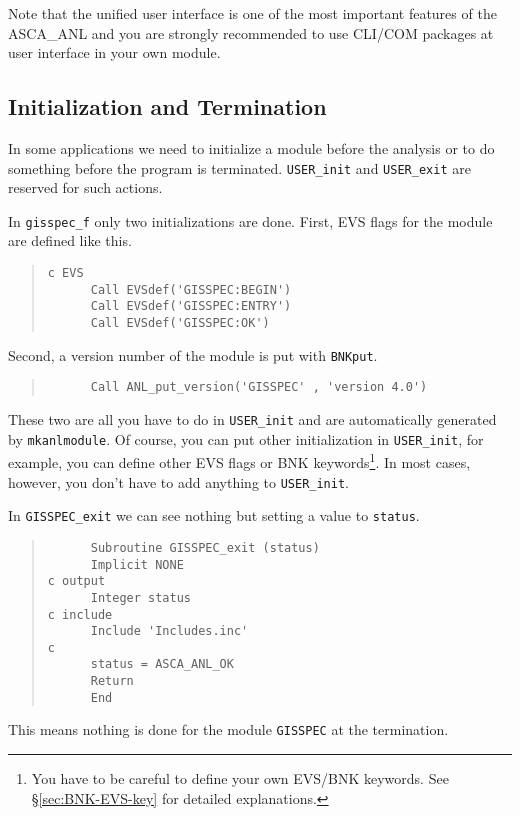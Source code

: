Note that
the unified user interface
is one of the most important features of the ASCA\_ANL
and you are strongly recommended to use CLI/COM packages
at user interface in your own module.

\subsection{Initialization and Termination}
In some applications
we need to initialize a module before the analysis
or to do something before the program is terminated.
{\tt USER\_init} and {\tt USER\_exit} are reserved for such actions.

In {\tt gisspec\_f}
only two initializations are done.
First,
EVS flags for the module are defined like this.
\begin{quote}\baselineskip 3.2mm\begin{verbatim}
c EVS
      Call EVSdef('GISSPEC:BEGIN')
      Call EVSdef('GISSPEC:ENTRY')
      Call EVSdef('GISSPEC:OK')
\end{verbatim}\end{quote}
%
Second,
a version number of the module is put with {\tt BNKput}.
\begin{quote}\baselineskip 3.2mm\begin{verbatim}
      Call ANL_put_version('GISSPEC' , 'version 4.0')
\end{verbatim}\end{quote}

These two are all you have to do in {\tt USER\_init}
and are automatically generated by {\tt mkanlmodule}.
Of course,
you can put other initialization in {\tt USER\_init},
for example,
you can define other EVS flags or BNK keywords\footnote{
You have to be careful to define your own EVS/BNK keywords.
See \S \ref{sec:BNK-EVS-key} for detailed explanations.
}.
In most cases,
however,
you don't have to add anything to {\tt USER\_init}.

In {\tt GISSPEC\_exit}
we can see nothing but setting a value to {\tt status}.
\begin{quote}\baselineskip 3.2mm\begin{verbatim}
      Subroutine GISSPEC_exit (status)
      Implicit NONE
c output
      Integer status
c include
      Include 'Includes.inc'
c
      status = ASCA_ANL_OK
      Return
      End
\end{verbatim}\end{quote}
This means
nothing is done for the module {\tt GISSPEC} at the termination.

